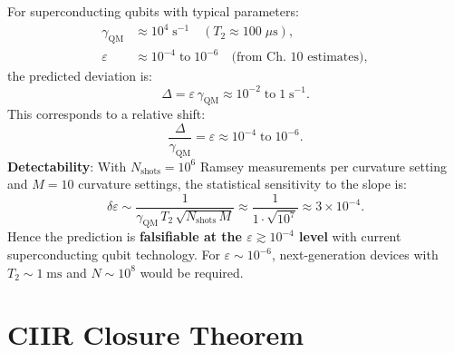 \begin{theorem}\label{thm:12.15}
For superconducting qubits with typical parameters:
\begin{align}
  \gamma_{\mathrm{QM}} &\approx 10^4\;\mathrm{s}^{-1}
    \quad (T_2 \approx 100\;\mu\mathrm{s}), \nonumber \\
  \varepsilon &\approx 10^{-4}\;\text{to}\;10^{-6}
    \quad\text{(from Ch.~10 estimates)}, \nonumber
\end{align}
the predicted deviation is:
\begin{equation}\label{eq:effect-size}
  \Delta = \varepsilon\,\gamma_{\mathrm{QM}}
  \approx 10^{-2}\;\text{to}\;1\;\mathrm{s}^{-1}.
\end{equation}
This corresponds to a relative shift:
\[
  \frac{\Delta}{\gamma_{\mathrm{QM}}} = \varepsilon
  \approx 10^{-4}\;\text{to}\;10^{-6}.
\]
\textbf{Detectability}: With $N_{\mathrm{shots}} = 10^6$ Ramsey measurements
per curvature setting and $M = 10$ curvature settings, the statistical
sensitivity to the slope is:
\[
  \delta\varepsilon \sim \frac{1}{\gamma_{\mathrm{QM}}\,T_2\,\sqrt{N_{\mathrm{shots}}\,M}}
  \approx \frac{1}{1 \cdot \sqrt{10^7}} \approx 3 \times 10^{-4}.
\]
Hence the prediction is \textbf{falsifiable at the $\varepsilon \gtrsim 10^{-4}$
level} with current superconducting qubit technology.  For $\varepsilon \sim 10^{-6}$,
next-generation devices with $T_2 \sim 1\;\mathrm{ms}$ and $N \sim 10^8$
would be required.
\end{theorem}

\section{CIIR Closure Theorem}
\label{sec:closure}

